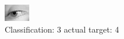 \begin{figure}[h!]
\begin{center}
\includegraphics[width=0.60\columnwidth]{figures/ID2943_class_3_target_4.png}
\end{center}
\caption{ Classification: 3 actual target: 4}
\label{fig:ID2943_class_3_target_4}
\end{figure}
